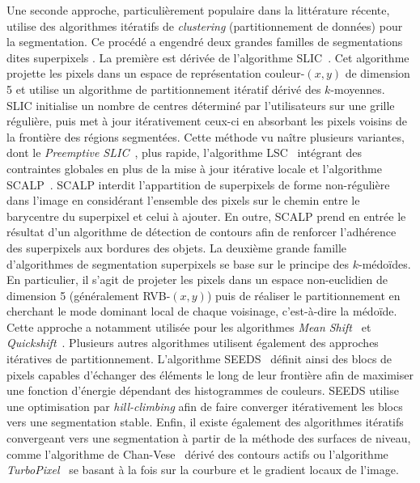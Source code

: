 Une seconde approche, particulièrement populaire dans la littérature récente, utilise des algorithmes itératifs de \emph{clustering} (partitionnement de données) pour la segmentation. Ce procédé a engendré deux grandes familles de segmentations dites \og superpixels \fg. La première est dérivée de l'algorithme \gls{SLIC}~\cite{achanta_slic_2010}. Cet algorithme projette les pixels dans un espace de représentation couleur-$(x,y)$ de dimension 5 et utilise un algorithme de partitionnement itératif dérivé des $k$-moyennes. \gls{SLIC} initialise un nombre de centres déterminé par l'utilisateurs sur une grille régulière, puis met à jour itérativement ceux-ci en absorbant les pixels voisins de la frontière des régions segmentées. Cette méthode vu naître plusieurs variantes, dont le \emph{Preemptive SLIC}~\cite{neubert_compact_2014}, plus rapide, l'algorithme \gls{LSC}~\cite{li_superpixel_2015} intégrant des contraintes globales en plus de la mise à jour itérative locale et l'algorithme \gls{SCALP}~\cite{giraud_robust_2018}. \gls{SCALP} interdit l'appartition de superpixels de forme non-régulière dans l'image en considérant l'ensemble des pixels sur le chemin entre le barycentre du superpixel et celui à ajouter. En outre, \gls{SCALP} prend en entrée le résultat d'un algorithme de détection de contours afin de renforcer l'adhérence des superpixels aux bordures des objets.
La deuxième grande famille d'algorithmes de segmentation superpixels se base sur le principe des $k$-médoïdes. En particulier, il s'agit de projeter les pixels dans un espace non-euclidien de dimension 5 (généralement RVB-$(x,y)$) puis de réaliser le partitionnement en cherchant le mode dominant local de chaque voisinage, c'est-à-dire la médoïde. Cette approche a notamment utilisée pour les algorithmes \emph{Mean Shift}~\cite{comaniciu_mean_2002} et \emph{Quickshift}~\cite{vedaldi_quick_2008}.
Plusieurs autres algorithmes utilisent également des approches itératives de partitionnement. L'algorithme \gls{SEEDS}~\cite{bergh_seeds:_2012} définit ainsi des blocs de pixels capables d'échanger des éléments le long de leur frontière afin de maximiser une fonction d'énergie dépendant des histogrammes de couleurs. \gls{SEEDS} utilise une optimisation par \emph{hill-climbing} afin de faire converger itérativement les blocs vers une segmentation stable. Enfin, il existe également des algorithmes itératifs convergeant vers une segmentation à partir de la méthode des surfaces de niveau, comme l'algorithme de Chan-Vese~\cite{chan_active_1999} dérivé des contours actifs ou l'algorithme \emph{TurboPixel}~\cite{levinshtein_turbopixels:_2009} se basant à la fois sur la courbure et le gradient locaux de l'image.

